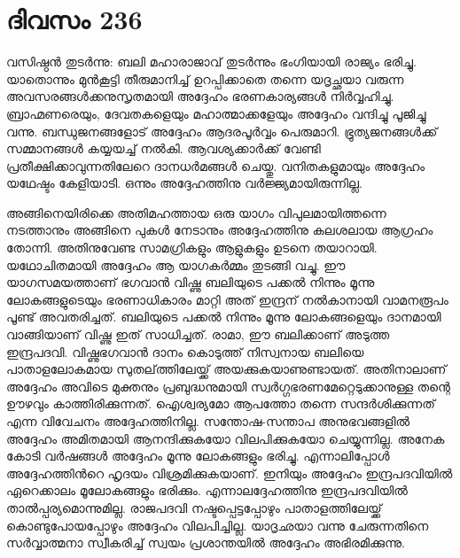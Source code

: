 \section{ദിവസം 236}


വസിഷ്ഠന്‍ തുടര്‍ന്നു: ബലി മഹാരാജാവ് തുടര്‍ന്നും ഭംഗിയായി രാജ്യം ഭരിച്ചു. യാതൊന്നും മുന്‍കൂട്ടി തീരുമാനിച്ച് ഉറപ്പിക്കാതെ തന്നെ യദൃച്ഛയാ വരുന്ന അവസരങ്ങള്‍ക്കനുസൃതമായി അദ്ദേഹം ഭരണകാര്യങ്ങള്‍ നിര്‍വ്വഹിച്ചു. ബ്രാഹ്മണരെയും, ദേവതകളെയും മഹാത്മാക്കളേയും അദ്ദേഹം വന്ദിച്ചു പൂജിച്ചു വന്നു.  ബന്ധുജനങ്ങളോട് അദ്ദേഹം ആദരപൂര്‍വ്വം പെരുമാറി. ഭ്രുത്യജനങ്ങള്‍ക്ക് സമ്മാനങ്ങള്‍ കയ്യയച്ച് നല്‍കി. ആവശ്യക്കാര്‍ക്ക് വേണ്ടി  പ്രതീക്ഷിക്കാവുന്നതിലേറെ  ദാനധര്‍മങ്ങള്‍ ചെയ്തു. വനിതകളുമായും അദ്ദേഹം യഥേഷ്ടം കേളിയാടി. ഒന്നും അദ്ദേഹത്തിനു വര്‍ജ്ജ്യമായിരുന്നില്ല.

അങ്ങിനെയിരിക്കെ അതിമഹത്തായ ഒരു യാഗം വിപുലമായിത്തന്നെ  നടത്താനും അങ്ങിനെ പുകള്‍ നേടാനും അദ്ദേഹത്തിനു കലശലായ ആഗ്രഹം തോന്നി. അതിനുവേണ്ട സാമഗ്രികളും ആളുകളും ഉടനെ തയാറായി. യഥോചിതമായി അദ്ദേഹം ആ യാഗകര്‍മ്മം തുടങ്ങി വച്ചു. ഈ യാഗസമയത്താണ് ഭഗവാന്‍ വിഷ്ണു ബലിയുടെ പക്കല്‍ നിന്നും മൂന്നു ലോകങ്ങളുടെയും ഭരണാധികാരം മാറ്റി അത് ഇന്ദ്രന് നല്‍കാനായി വാമനരൂപം പൂണ്ട് അവതരിച്ചത്. ബലിയുടെ പക്കല്‍ നിന്നും മൂന്നു ലോകങ്ങളെയും ദാനമായി വാങ്ങിയാണ് വിഷ്ണു ഇത് സാധിച്ചത്.  രാമാ, ഈ ബലിക്കാണ്  അടുത്ത ഇന്ദ്രപദവി. വിഷ്ണുഭഗവാന്‍ ദാനം കൊടുത്ത് നിസ്വനായ ബലിയെ പാതാളലോകമായ സുതല്‌ത്തിലേയ്ക്ക് അയക്കുകയാണുണ്ടായത്. അതിനാലാണ് അദ്ദേഹം അവിടെ മുക്തനും പ്രബുദ്ധനുമായി സ്വര്‍ഗ്ഗഭരണമേറ്റെടുക്കാനുള്ള   തന്റെ ഊഴവും കാത്തിരിക്കുന്നത്. ഐശ്വര്യമോ ആപത്തോ തന്നെ സന്ദര്‍ശിക്കുന്നത് എന്ന വിവേചനം അദ്ദേഹത്തിനില്ല. സന്തോഷ-സന്താപ അനുഭവങ്ങളില്‍ അദ്ദേഹം അമിതമായി  ആനന്ദിക്കുകയോ വിലപിക്കുകയോ ചെയ്യുന്നില്ല. അനേക കോടി വര്‍ഷങ്ങള്‍ അദ്ദേഹം മൂന്നു ലോകങ്ങളും ഭരിച്ചു. എന്നാലിപ്പോള്‍ അദ്ദേഹത്തിന്‍റെ ഹൃദയം വിശ്രമിക്കുകയാണ്. ഇനിയും അദ്ദേഹം ഇന്ദ്രപദവിയില്‍ ഏറെക്കാലം മൂലോകങ്ങളും ഭരിക്കും. എന്നാലദ്ദേഹത്തിനു ഇന്ദ്രപദവിയില്‍ താല്‍പ്പര്യമൊന്നുമില്ല. രാജപദവി നഷ്ടപ്പെട്ടപ്പോഴും പാതാളത്തിലേയ്ക്ക് കൊണ്ടുപോയപ്പോഴും അദ്ദേഹം വിലപിച്ചില്ല. യാദൃഛയാ വന്നു ചേരുന്നതിനെ സര്‍വ്വാത്മനാ സ്വീകരിച്ച് സ്വയം പ്രശാന്തയില്‍ അദ്ദേഹം അഭിരമിക്കുന്നു.

